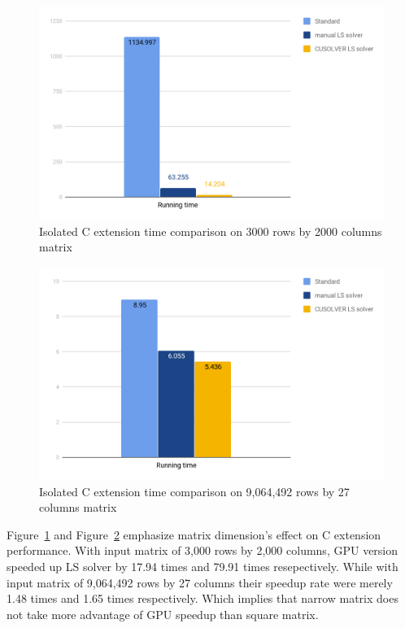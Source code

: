 \documentclass[English]{dicomopapers}
\begin{document}
\begin{figure}[ht]
  \vspace*{-2.2cm}
  \centering
  \includegraphics[width=\columnwidth,natwidth=1200,natheight=742]{c_square.png}
  \caption{Isolated C extension time comparison on 3000 rows by 2000 columns matrix}\label{fig:c_square}
\end{figure}

\begin{figure}[ht]
  \vspace*{-1.5cm}
  \centering
  \includegraphics[width=\columnwidth,natwidth=1200,natheight=742]{c_narrow.png}
  \caption{Isolated C extension time comparison on 9,064,492 rows by 27 columns matrix}\label{fig:c_narrow}
\end{figure}
Figure~\ref{fig:c_square} and Figure~\ref{fig:c_narrow} emphasize matrix dimension's effect on C extension performance. With input matrix of 3,000 rows by 2,000 columns, GPU version speeded up LS solver by 17.94 times and 79.91 times resepectively. While with input matrix of 9,064,492 rows by 27 columns their speedup rate were merely 1.48 times and 1.65 times respectively. Which implies that narrow matrix does not take more advantage of GPU speedup than square matrix.
\end{document}
